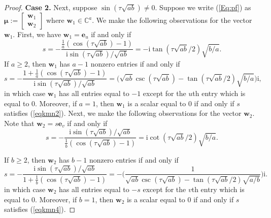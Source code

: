 \documentclass[10pt,a4paper]{amsart}
\def\C{\mathbb{C}}
\newcommand{\be}{\mathbf e}
\newcommand{\bmu}{{\boldsymbol{\mu}}}
\newcommand{\bw}{\mathbf w}
\def\ii{\mathrm{i}}
\newcommand{\uno}{\mathbf 1}
\begin{document}
\begin{proof}
\noindent \textbf{Case 2.} Next, suppose $\sin( \tau\sqrt{ab})\neq 0$. 
Suppose we write (\ref{Eq:pf}) as $\bmu:=\begin{bmatrix}
\bw_1 \\ \bw_2\end{bmatrix}$ where $\bw_1\in\C^a$. We make the following observations for the vector $\bw_1$. First, we have $\bw_1=\be_u$ if and only if 
\begin{equation}
\label{eqkmn1}
s=-\frac{\frac{1}{a}(\cos(\tau\sqrt{ab})-1)}{\ii\sin(\tau\sqrt{ab})/\sqrt{ab}}=-\ii \tan(\tau\sqrt{ab}/2)\sqrt{b/a}.
\end{equation}
If $a\geq 2$, then $\bw_1$ has $a-1$ nonzero entries if and only if 
\begin{equation}
\label{eqkmn2}
s=-\frac{1+\frac{1}{a}(\cos(\tau\sqrt{ab})-1)}{\ii\sin(\tau\sqrt{ab})/\sqrt{ab}}=\bigg(\sqrt{ab}\csc(\tau\sqrt{ab})-\tan(\tau\sqrt{ab}/2)\sqrt{b/a}\bigg)\ii,
\end{equation}
in which case $\bw_1$ has all entries equal to $-1$
except for the $u$th entry which is equal to 0. Moreover, if $a=1$, then $\bw_1$ is a scalar equal to 0 if and only if $s$ satisfies (\ref{eqkmn2}). Next, we make the following observations for the vector $\bw_2$. Note that $\bw_2=s\be_v$ if and only if 
\begin{equation}
\label{eqkmn3}
s=-\frac{\ii\sin(\tau\sqrt{ab})/\sqrt{ab}}{\frac{1}{b}(\cos(\tau\sqrt{ab})-1)}=\ii \cot(\tau\sqrt{ab}/2)\sqrt{b/a}.
\end{equation}
\item If $b\geq 2$, then $\bw_2$ has $b-1$ nonzero entries if and only if 
\begin{equation}
\label{eqkmn4}
s=-\frac{\ii\sin(\tau\sqrt{ab})/\sqrt{ab}}{1+\frac{1}{b}(\cos(\tau\sqrt{ab})-1)}=-\bigg(\frac{1}{\sqrt{ab}\csc(\tau\sqrt{ab})-\tan(\tau\sqrt{ab}/2)\sqrt{a/b}}\bigg)\ii.
\end{equation}
in which case $\bw_2$ has all entries equal to $-s$ 
except for the $v$th entry which is equal to 0. Moreover, if $b=1$, then $\bw_2$ is a scalar equal to 0 if and only if $s$ satisfies (\ref{eqkmn4}).

\end{proof}
\end{document}
